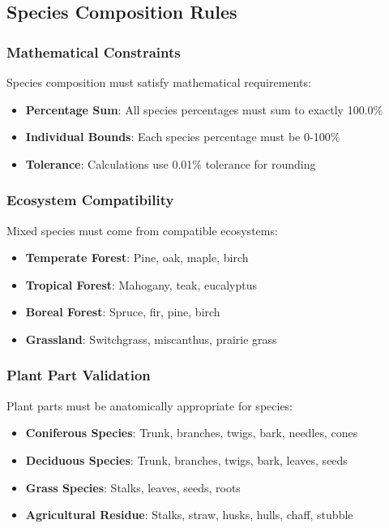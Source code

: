\subsection{Species Composition Rules}
\label{sec:species-composition}

\subsubsection{Mathematical Constraints}

Species composition must satisfy mathematical requirements:

\begin{itemize}
    \item \textbf{Percentage Sum}: All species percentages must sum to exactly 100.0\%
    \item \textbf{Individual Bounds}: Each species percentage must be 0-100\%
    \item \textbf{Tolerance}: Calculations use 0.01\% tolerance for rounding
\end{itemize}

\subsubsection{Ecosystem Compatibility}

Mixed species must come from compatible ecosystems:

\begin{itemize}
    \item \textbf{Temperate Forest}: Pine, oak, maple, birch
    \item \textbf{Tropical Forest}: Mahogany, teak, eucalyptus
    \item \textbf{Boreal Forest}: Spruce, fir, pine, birch
    \item \textbf{Grassland}: Switchgrass, miscanthus, prairie grass
\end{itemize}

\subsubsection{Plant Part Validation}

Plant parts must be anatomically appropriate for species:

\begin{itemize}
    \item \textbf{Coniferous Species}: Trunk, branches, twigs, bark, needles, cones
    \item \textbf{Deciduous Species}: Trunk, branches, twigs, bark, leaves, seeds
    \item \textbf{Grass Species}: Stalks, leaves, seeds, roots
    \item \textbf{Agricultural Residue}: Stalks, straw, husks, hulls, chaff, stubble
\end{itemize}

